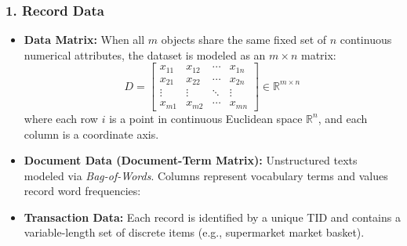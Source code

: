 \subsubsection{1. Record Data}
\begin{itemize}
    \item \textbf{Data Matrix:} When all $m$ objects share the same fixed set of $n$ continuous numerical attributes, the dataset is modeled as an $m \times n$ matrix:
    \begin{equation}
        D = \begin{bmatrix}
        x_{11} & x_{12} & \cdots & x_{1n} \\
        x_{21} & x_{22} & \cdots & x_{2n} \\
        \vdots & \vdots & \ddots & \vdots \\
        x_{m1} & x_{m2} & \cdots & x_{mn}
        \end{bmatrix} \in \mathbb{R}^{m \times n}
    \end{equation}
    where each row $i$ is a point in continuous Euclidean space $\mathbb{R}^n$, and each column is a coordinate axis.
    \item \textbf{Document Data (Document-Term Matrix):} Unstructured texts modeled via \textit{Bag-of-Words}. Columns represent vocabulary terms and values record word frequencies:
    \begin{table}[H]
    \centering
    \caption{Document-Term Matrix representation for text collections.}
    \label{tab:doc-term-matrix-en}
    \end{table}
    \item \textbf{Transaction Data:} Each record is identified by a unique TID and contains a variable-length set of discrete items (e.g., supermarket market basket).
\end{itemize}

